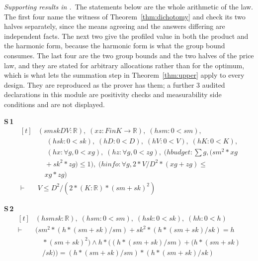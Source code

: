 
\noindent\emph{Supporting results in .}~The statements below are the whole arithmetic of the law. The first four name the witness of Theorem~\ref{thm:dichotomy} and check its two halves separately, since the means agreeing and the answers differing are independent facts. The next two give the profiled value in both the product and the harmonic form, because the harmonic form is what the group bound consumes. The last four are the two group bounds and the two halves of the price law, and they are stated for arbitrary allocations rather than for the optimum, which is what lets the summation step in Theorem~\ref{thm:upper} apply to every design. They are reproduced as the prover has them; a further $3$ audited declarations in this module are positivity checks and measurability side conditions and are not displayed.

\noindent\textbf{S\,1}\quad{}
{\footnotesize\[ \begin{aligned}[t]
&(\mathit{sm} \mathit{sk} \mathit{D} \mathit{V} : \mathbb{R} ),\; (\mathit{x} \mathit{z} : \mathit{Fin} \mathit{K} \to \mathbb{R} ),\; (\mathit{hsm} : 0 < \mathit{sm}),\\
&\quad \; (\mathit{hsk} : 0 < \mathit{sk}),\; (\mathit{hD} : 0 < \mathit{D}),\; (\mathit{hV} : 0 < \mathit{V}),\; (\mathit{hK} : 0 < \mathit{K}),\\
&\quad \; (\mathit{hx} : \forall \mathit{g}, 0 < \mathit{x} \mathit{g}),\; (\mathit{hz} : \forall \mathit{g}, 0 < \mathit{z} \mathit{g}),\; (\mathit{hbudget} : \textstyle\sum \mathit{g}, (\mathit{sm} ^{2} * \mathit{x} \mathit{g}\\
&\quad + \mathit{sk} ^{2} * \mathit{z} \mathit{g}) \leq 1),\; (\mathit{hinfo} : \forall \mathit{g}, 2 * \mathit{V} / \mathit{D} ^{2} * (\mathit{x} \mathit{g} + \mathit{z} \mathit{g}) \leq\\
&\quad \mathit{x} \mathit{g} * \mathit{z} \mathit{g})\\
\vdash\;&\mathit{V} \leq \mathit{D} ^{2} / (2 * (\mathit{K} : \mathbb{R} ) * (\mathit{sm} + \mathit{sk}) ^{2})
\end{aligned} \]}

\noindent\textbf{S\,2}\quad{}
{\footnotesize\[ \begin{aligned}[t]
&(\mathit{h} \mathit{sm} \mathit{sk} : \mathbb{R} ),\; (\mathit{hsm} : 0 < \mathit{sm}),\; (\mathit{hsk} : 0 < \mathit{sk}),\; (\mathit{hh} : 0 < \mathit{h})\\
\vdash\;&(\mathit{sm} ^{2} * (\mathit{h} * (\mathit{sm} + \mathit{sk}) / \mathit{sm}) + \mathit{sk} ^{2} * (\mathit{h} * (\mathit{sm} + \mathit{sk}) / \mathit{sk}) = \mathit{h}\\
&\quad * (\mathit{sm} + \mathit{sk}) ^{2}) \wedge \mathit{h} * ((\mathit{h} * (\mathit{sm} + \mathit{sk}) / \mathit{sm}) + (\mathit{h} * (\mathit{sm} + \mathit{sk})\\
&\quad / \mathit{sk})) = (\mathit{h} * (\mathit{sm} + \mathit{sk}) / \mathit{sm}) * (\mathit{h} * (\mathit{sm} + \mathit{sk}) / \mathit{sk})
\end{aligned} \]}


